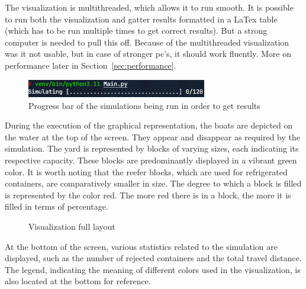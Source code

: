 \documentclass{article}
\begin{document}
The visualization is multithreaded, which allows it to run smooth. It is
possible to run both the visualization and gatter results formatted in a LaTex
table (which has to be run multiple times to get correct results). But a strong
computer is needed to pull this off. Because of the multithreaded visualization
was it not usable, but in case of stronger pc's, it should work fluently. More
on performance later in Section~\ref{sec:performance}.
\begin{figure}
    \centering
    \includegraphics[width=0.7\textwidth]{fig/progressbar.png}
    \caption{Progress bar of the simulations being run in order to get results}\label{fig:progress bar}
\end{figure}

During the execution of the graphical representation, the boats are depicted on
the water at the top of the screen. They appear and disappear as required by
the simulation. The yard is represented by blocks of varying sizes, each
indicating its respective capacity. These blocks are predominantly displayed in
a vibrant green color. It is worth noting that the reefer blocks, which are
used for refrigerated containers, are comparatively smaller in size. The degree
to which a block is filled is represented by the color red. The more red there
is in a block, the more it is filled in terms of percentage.
\begin{figure}
    \centering
    \caption{Visualization full layout}\label{fig:visualization}
\end{figure}

At the bottom of the screen, various statistics related to the simulation are
displayed, such as the number of rejected containers and the total travel
distance. The legend, indicating the meaning of different colors used in the
visualization, is also located at the bottom for reference.
\end{document}
